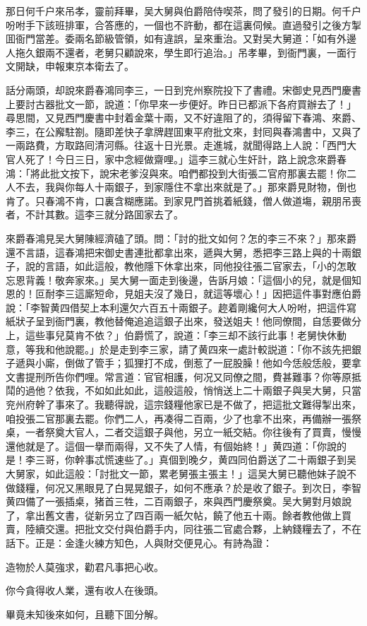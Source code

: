 那日何千户來吊孝，靈前拜畢，吴大舅與伯爵陪侍喫茶，問了發引的日期。何千户吩咐手下該班排軍，合答應的，一個也不許動，都在這裏伺候。直過發引之後方掣囬衙門當差。委兩名節級管領，如有違誤，呈來重治。又對吴大舅道：「如有外邊人拖久銀兩不還者，老舅只顧說來，學生即行追治。」吊孝畢，到衙門裏，一面行文開缺，申報東京本衛去了。

話分兩頭，却說來爵春鴻同李三，一日到兖州察院投下了書禮。宋御史見西門慶書上要討古器批文一節，說道：「你早來一步便好。昨日已都派下各府買辦去了！」尋思間，又見西門慶書中封着金葉十兩，又不好違阻了的，須得留下春鴻、來爵、李三，在公廨駐劄。隨即差快子拿牌趕囬東平府批文來，封囘與春鴻書中，又與了一兩路費，方取路囘清河縣。往返十日光景。走進城，就聞得路上人說：「西門大官人死了！今日三日，家中念經做齋哩。」這李三就心生奸計，路上說念來爵春鴻：「將此批文按下，說宋老爹沒與來。咱們都投到大街張二官府那裏去罷！你二人不去，我與你每人十兩銀子，到家隱住不拿出來就是了。」那來爵見財物，倒也肯了。只春鴻不肯，口裏含糊應諾。到家見門首挑着紙錢，僧人做道塲，親朋吊喪者，不計其數。這李三就分路囬家去了。

來爵春鴻見吴大舅陳經濟磕了頭。問：「討的批文如何？怎的李三不來？」那來爵還不言語，這春鴻把宋御史書連批都拿出來，遞與大舅，悉把李三路上與的十兩銀子，說的言語，如此這般，教他隱下休拿出來，同他投往張二官家去，「小的怎敢忘恩背義！敬奔家來。」吴大舅一面走到後邊，告訴月娘：「這個小的兒，就是個知恩的！叵耐李三這廝短命，見姐夫沒了幾日，就這等壞心！」因把這件事對應伯爵說：「李智黄四借契上本利還欠六百五十兩銀子。趂着剛纔何大人吩咐，把這件寫紙狀子呈到衙門裏，教他替俺追追這銀子出來，發送姐夫！他同僚間，自恁要做分上，這些事兒莫肯不依？」伯爵慌了，說道：「李三却不該行此事！老舅快休動意，等我和他說罷。」於是走到李三家，請了黄四來一處計較説道：「你不該先把銀子遞與小廝，倒做了管手；狐狸打不成，倒惹了一屁股臊！他如今恁般恁般，要拿文書提刑所告你們哩。常言道：官官相護，何况又同僚之間，費甚難事？你等原抵鬦的過他？依我，不如如此如此，這般這般，悄悄送上二十兩銀子與吴大舅，只當兖州府幹了事來了。我聽得說，這宗錢糧他家已是不做了，把這批文難得掣出來，咱投張二官那裏去罷。你們二人，再凑得二百兩，少了也拿不出來，再備辦一張祭桌，一者祭奠大官人，二者交這銀子與他，另立一紙交結。你往後有了買賣，慢慢還他就是了。這個一擧而兩得，又不失了人情，有個始終！」黄四道：「你說的是！李三哥，你幹事忒慌速些了。」真個到晚夕，黄四同伯爵送了二十兩銀子到吴大舅家，如此這般：「討批文一節，累老舅張主張主！」這吴大舅已聽他妹子說不做錢糧，何况又黑眼見了白晃晃銀子，如何不應承？於是收了銀子。到次日，李智黄四備了一張插桌，猪首三牲，二百兩銀子，來與西門慶祭奠。吴大舅對月娘說了，拿出舊文書，従新另立了四百兩一紙欠帖，饒了他五十兩。餘者教他做上買賣，陸續交還。把批文交付與伯爵手内，同往張二官處合夥，上納錢糧去了，不在話下。正是：金逢火練方知色，人與財交便見心。有詩為證：

\begin{myquote}
造物於人莫強求，勸君凡事把心收。

你今貪得收人業，還有收人在後頭。
\end{myquote}

畢竟未知後來如何，且聽下囬分解。

